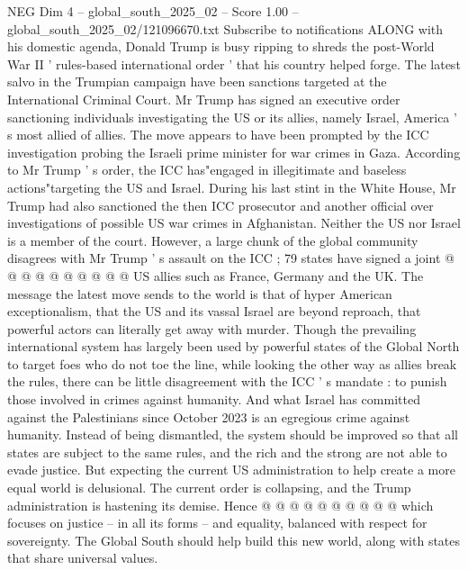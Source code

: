 \begin{textsample}{NEG Dim 4 – global\_south\_2025\_02 – Score 1.00 – global\_south\_2025\_02/121096670.txt}  \label{ex:f4_neg_440}
Subscribe to notifications ALONG with his domestic agenda, Donald Trump is busy ripping to shreds the post-World War II ' rules-based international order ' that his country helped forge.
The latest salvo in the Trumpian campaign have been sanctions targeted at the International Criminal Court.
Mr Trump has signed an executive order sanctioning individuals investigating the US or its allies, namely Israel, America ' s most allied of allies.
The move appears to have been prompted by the ICC investigation probing the Israeli prime minister for war crimes in Gaza.
According to Mr Trump ' s order, the ICC has"engaged in illegitimate and baseless actions"targeting the US and Israel.
During his last stint in the White House, Mr Trump had also sanctioned the then ICC prosecutor and another official over investigations of possible US war crimes in Afghanistan.
Neither the US nor Israel is a member of the court.
However, a large chunk of the global community disagrees with Mr Trump ' s assault on the ICC ; 79 states have signed a joint @ @ @ @ @ @ @ @ @ @ US allies such as France, Germany and the UK.
The message the latest move sends to the world is that of hyper American exceptionalism, that the US and its vassal Israel are beyond reproach, that powerful actors can literally get away with murder.
Though the prevailing international system has largely been used by powerful states of the Global North to target foes who do not toe the line, while looking the other way as allies break the rules, there can be little disagreement with the ICC ' s mandate : to punish those involved in crimes against humanity.
And what Israel has committed against the Palestinians since October 2023 is an egregious crime against humanity.
Instead of being dismantled, the system should be improved so that all states are subject to the same rules, and the rich and the strong are not able to evade justice.
But expecting the current US administration to help create a more equal world is delusional.
The current order is collapsing, and the Trump administration is hastening its demise.
Hence @ @ @ @ @ @ @ @ @ @ which focuses on justice -- in all its forms -- and equality, balanced with respect for sovereignty.
The Global South should help build this new world, along with states that share universal values.

\end{textsample}
